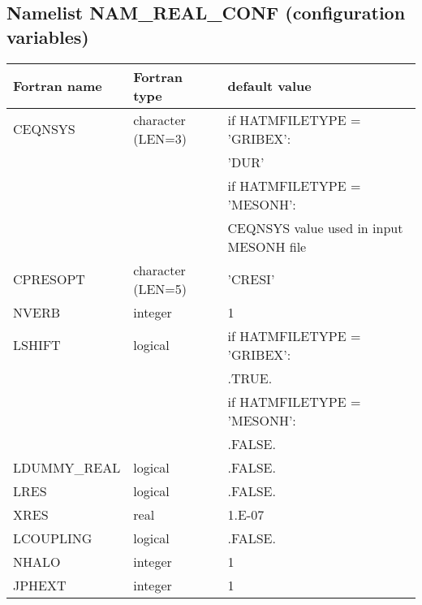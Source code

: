 \subsection{Namelist NAM\_REAL\_CONF  (configuration variables)}

\begin{center}
\begin{tabular} {|l|l|l|}
\hline
Fortran name & Fortran type & default value\\
\hline
\hline
CEQNSYS       & character (LEN=3)  &if HATMFILETYPE = 'GRIBEX': \\
 & & \hspace*{0.5cm}'DUR' \\
              &                    & if HATMFILETYPE = 'MESONH': \\
 & & \hspace*{0.5cm} CEQNSYS value used in input MESONH file\\
CPRESOPT      & character (LEN=5)  & 'CRESI' \\
NVERB         & integer            & 1      \\
LSHIFT        & logical            & if HATMFILETYPE = 'GRIBEX':  \\
 & & \hspace*{0.5cm}.TRUE. \\
              &                    & if HATMFILETYPE = 'MESONH': \\
 & & \hspace*{0.5cm}.FALSE. \\
LDUMMY\_REAL  & logical            & .FALSE.                     \\
LRES          & logical            & .FALSE.                     \\
XRES          & real               & 1.E-07                      \\
LCOUPLING     & logical            & .FALSE.                     \\
NHALO      & integer        & 1      \\
JPHEXT     & integer        & 1      \\
\hline
\end{tabular}
\end{center}

